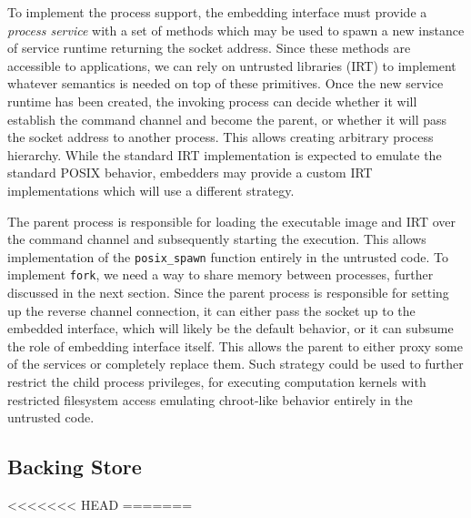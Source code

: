 
To implement the process support, the embedding interface must provide a
\emph{process service} with a set of methods which may be used to spawn
a new instance of service runtime returning the socket address. Since
these methods are accessible to applications, we can rely on untrusted
libraries (\ie IRT) to implement whatever semantics is needed on top of
these primitives. Once the new service runtime has been created, the
invoking process can decide whether it will establish the command
channel and become the parent, or whether it will pass the socket
address to another process.  This allows creating arbitrary process
hierarchy.  While the standard IRT implementation is expected to emulate
the standard POSIX behavior, embedders may provide a custom IRT
implementations which will use a different strategy.

The parent process is responsible for loading the executable image and
IRT over the command channel and subsequently starting the execution.
This allows implementation of the \lstinline`posix_spawn` function
entirely in the untrusted code. To implement \lstinline`fork`, we need a
way to share memory between processes, further discussed in the next
section.  Since the parent process is responsible for setting up the
reverse channel connection, it can either pass the socket up to the
embedded interface, which will likely be the default behavior, or it can
subsume the role of embedding interface itself. This allows the parent
to either proxy some of the services or completely replace them. Such
strategy could be used to further restrict the child process privileges,
\eg for executing computation kernels with restricted filesystem access
emulating chroot-like behavior entirely in the untrusted code.

\subsection{Backing Store}
\label{sub:backing_store}

<<<<<<< HEAD
=======

